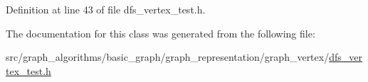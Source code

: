 Definition at line 43 of file dfs\+\_\+vertex\+\_\+test.\+h.



The documentation for this class was generated from the following file\+:\begin{DoxyCompactItemize}
\item 
src/graph\+\_\+algorithms/basic\+\_\+graph/graph\+\_\+representation/graph\+\_\+vertex/\hyperlink{dfs__vertex__test_8h}{dfs\+\_\+vertex\+\_\+test.\+h}\end{DoxyCompactItemize}
